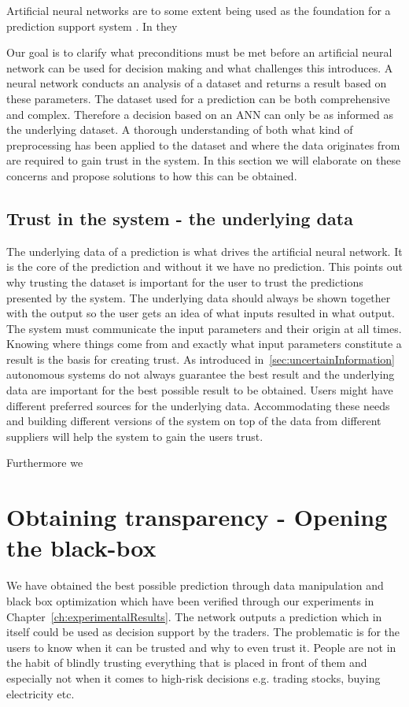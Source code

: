 Artificial neural networks are to some extent being used as the foundation for a prediction support system \cite{shim2002past}. In \cite{shim2002past} they   

Our goal is to clarify what preconditions must be met before an artificial neural network can be used for decision making and what challenges this introduces. A neural network conducts an analysis of a dataset and returns a result based on these parameters. The dataset used for a prediction can be both comprehensive and complex. Therefore a decision based on an ANN can only be as informed as the underlying dataset. A thorough understanding of both what kind of preprocessing has been applied to the dataset and where the data originates from are required to gain trust in the system. In this section we will elaborate on these concerns and propose solutions to how this can be obtained.

\subsection{Trust in the system - the underlying data}
The underlying data of a prediction is what drives the artificial neural network. It is the core of the prediction and without it we have no prediction. This points out why trusting the dataset is important for the user to trust the predictions presented by the system. The underlying data should always be shown together with the output so the user gets an idea of what inputs resulted in what output. The system must communicate the input parameters and their origin at all times. Knowing where things come from and exactly what input parameters constitute a result is the basis for creating trust. As introduced in~\ref{sec:uncertainInformation} autonomous systems do not always guarantee the best result and the underlying data are important for the best possible result to be obtained. Users might have different preferred sources for the underlying data. Accommodating these needs and building different versions of the system on top of the data from different suppliers will help the system to gain the users trust.

Furthermore we 


\section{Obtaining transparency - Opening the black-box}
We have obtained the best possible prediction through data manipulation and black box optimization which have been verified through our experiments in Chapter~\ref{ch:experimentalResults}. The network outputs a prediction which in itself could be used as decision support by the traders. The problematic is for the users to know when it can be trusted and why to even trust it. People are not in the habit of blindly trusting everything that is placed in front of them and especially not when it comes to high-risk decisions e.g. trading stocks, buying electricity etc.

